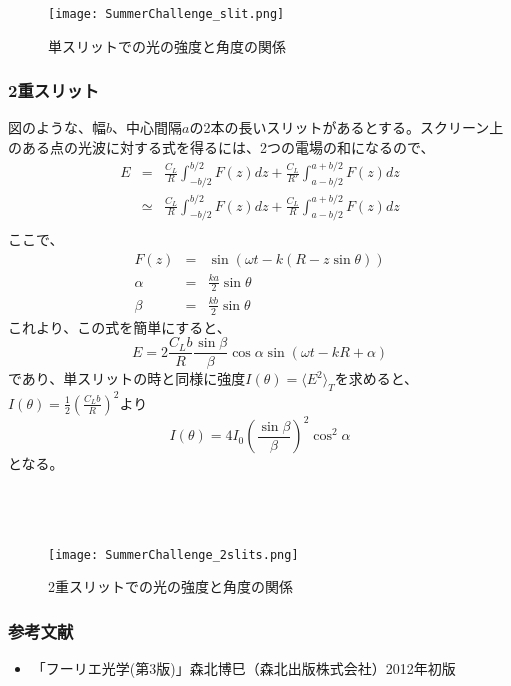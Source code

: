 \documentclass[10pt,a4j]{jarticle}
\begin{document}
\begin{figure}[h]
\begin{center}
\texttt{[image: SummerChallenge\_slit.png]}
\caption{単スリットでの光の強度と角度の関係}
\end{center}
\end{figure}

\clearpage

\subsubsection{2重スリット}
図のような、幅$b$、中心間隔$a$の2本の長いスリットがあるとする。スクリーン上のある点の光波に対する式を得るには、2つの電場の和になるので、
\begin{eqnarray*}
E &=& \frac{C_L}{R} \int_{-b/2}^{b/2} F(z) dz + \frac{C_L}{R'} \int_{a-b/2}^{a+b/2} F(z) dz \\
&\simeq& \frac{C_L}{R} \int_{-b/2}^{b/2} F(z) dz + \frac{C_L}{R} \int_{a-b/2}^{a+b/2} F(z) dz \\ 
\end{eqnarray*}
ここで、
\begin{eqnarray*}
F(z) &=& \sin(\omega t - k(R-z\sin\theta)) \\
\alpha &=& \frac{ka}{2} \sin\theta \\
\beta &=& \frac{kb}{2} \sin\theta
\end{eqnarray*}
これより、この式を簡単にすると、
\[
E = 2 \frac{C_L b}{R} \frac{\sin\beta}{\beta} \cos\alpha \sin(\omega t -kR + \alpha)
\]
であり、単スリットの時と同様に強度$I(\theta) = \langle E^2\rangle_T$を求めると、$I(\theta) = \frac{1}{2} (\frac{C_L b}{R})^2$より
\[
I(\theta) = 4I_0 \left(\frac{\sin \beta}{\beta}\right)^2 \cos^2 \alpha
\]
となる。\\
\\
\\
\\
\begin{figure}[h]
\begin{center}
\texttt{[image: SummerChallenge\_2slits.png]}
\caption{2重スリットでの光の強度と角度の関係}
\end{center}
\end{figure}

\subsubsection{参考文献}
\begin{itemize}
\item 「フーリエ光学(第3版)」森北博巳（森北出版株式会社）2012年初版
\end{itemize}
\clearpage
\end{document}
